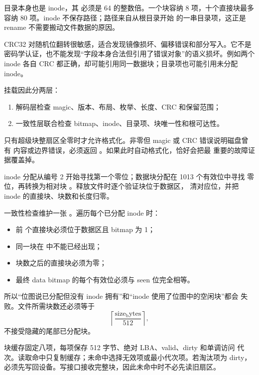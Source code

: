 目录本身也是 inode，其  必须是 64 的整数倍。一个块容纳
8 项，十个直接块最多容纳 80 项。inode 不保存路径；路径来自从根目录开始
的一串目录项，这正是 rename 不需要搬动文件数据的原因。

CRC32 对随机位翻转很敏感，适合发现镜像损坏、偏移错误和部分写入。它不是
密码学认证，也不能发现“字段本身合法但引用了错误对象”的语义损坏。例如两个
inode 各自 CRC 都正确，却可能引用同一数据块；目录项也可能引用未分配 inode。

挂载因此分两层：

\begin{enumerate}[label=\arabic*.]
  \item 解码层检查 magic、版本、布局、枚举、长度、CRC 和保留范围；
  \item 一致性层联合检查 bitmap、inode、目录项、块唯一性和根可达性。
\end{enumerate}

只有超级块整扇区全零时才允许格式化。非零但 magic 或 CRC 错误说明磁盘曾有
内容或边界错误，必须返回 。如果此时自动格式化，恰好会把最
重要的故障证据覆盖掉。

inode 分配从编号 2 开始寻找第一个零位；数据块分配在 1013 个有效位中寻找
零位，再转换为相对块 。释放文件时逐个验证块位于数据区，
清对应位，并把 inode 的直接块、块数和长度归零。

一致性检查维护一张 。遍历每个已分配 inode 时：

\begin{itemize}
  \item 前  个直接块必须位于数据区且 bitmap 为 1；
  \item 同一块在  中不能已经出现；
  \item 块数之后的直接块必须为零；
  \item 最终 data bitmap 的每个有效位必须与 seen 位完全相等。
\end{itemize}

所以“位图说已分配但没有 inode 拥有”和“inode 使用了位图中的空闲块”都会
失败。文件所需块数还必须等于
\[
  \left\lceil\frac{\mathrm{size_bytes}}{512}\right\rceil,
\]
不接受隐藏的尾部已分配块。

块缓存固定八项，每项保存 512 字节、绝对 LBA、valid、dirty 和单调访问
代次。读取命中只复制缓存；未命中选择无效项或最小代次项。若淘汰项为 dirty，
必须先写回设备。写接口接收完整块，因此未命中时不必先读旧扇区。

